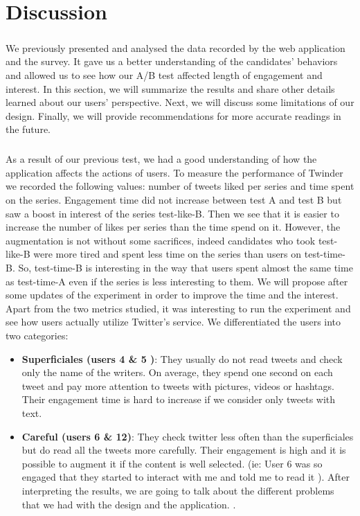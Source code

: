 \chapter{Discussion}

\paragraph{}
We previously presented and analysed the data recorded by the web application and the survey. It gave us a better understanding of the candidates' behaviors and allowed us to see how our A/B test affected length of engagement and interest. In this section, we will summarize the results and share other details learned about our users' perspective. Next, we will discuss some limitations of our design. Finally, we will provide recommendations for more accurate readings in the future.

\paragraph{}
As a result of our previous test, we had a good understanding of how the application affects the actions of users. To measure the performance of Twinder we recorded the following values: number of tweets liked per series and time spent on the series. Engagement time did not increase between test A and test B but saw a boost in interest of the series test-like-B. Then we see that it is easier to increase the number of likes per series than the time spend on it. However, the augmentation is not without some sacrifices, indeed candidates who took test-like-B were more tired and spent less time on the series than users on test-time-B. So, test-time-B is interesting in the way that users spent almost the same time as test-time-A even if the series is less interesting to them. We will propose after some updates of the experiment in order to improve the time and the interest. \\
Apart from the two metrics studied, it was interesting to run the experiment and see how users actually utilize Twitter's service. We differentiated the users into two categories:

\begin{itemize}
	\item \textbf{Superficiales (users 4 \& 5 )}: They usually do not read tweets and check only the name of the writers. On average, they spend one second on each tweet and pay more attention to tweets with pictures, videos or hashtags. Their engagement time is hard to increase if we consider only tweets with text.
	\item \textbf{Careful (users 6 \& 12)}: They check twitter less often than the superficiales but do read all the tweets more carefully. Their engagement is high and it is possible to augment it if the content is well selected. (ie: User 6 was so engaged that they started to interact with me and told me to read it ). After interpreting the results, we are going to talk about the different problems that we had with the design and the application.
\cite{s_engag_measure}.
\end{itemize}

